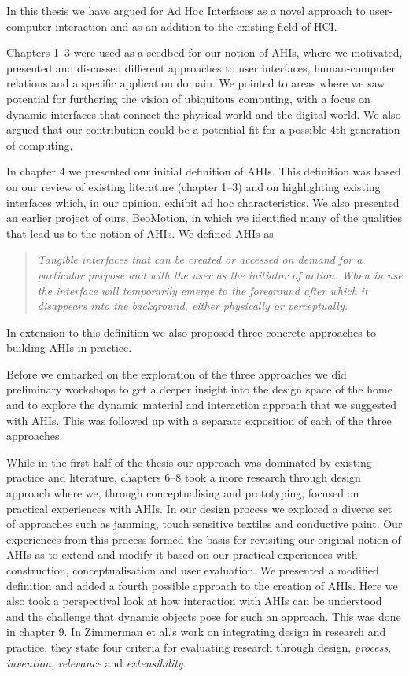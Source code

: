 
In this thesis we have argued for Ad Hoc Interfaces as a novel approach to user-computer interaction and as an addition to the existing field of HCI.

Chapters 1--3 were used as a seedbed for our notion of AHIs, where we motivated, presented and discussed different approaches to user interfaces, human-computer relations and a specific application domain.
We pointed to areas where we saw potential for furthering the vision of ubiquitous computing, with a focus on dynamic interfaces that connect the physical world and the digital world.
We also argued that our contribution could be a potential fit for a possible 4th generation of computing.  

In chapter 4 we presented our initial definition of AHIs.
This definition was based on our review of existing literature (chapter 1--3) and on highlighting existing interfaces which, in our opinion, exhibit ad hoc characteristics.
We also presented an earlier project of ours, BeoMotion, in which we identified many of the qualities that lead us to the notion of AHIs.
We defined AHIs as 

\begin{quotation}
\emph{Tangible interfaces that can be created or accessed on demand for a particular purpose and with the user as the initiator of action. When in use the interface will temporarily emerge to the foreground after which it disappears into the background, either physically or perceptually.}
\end{quotation}
In extension to this definition we also proposed three concrete approaches to building AHIs in practice.

Before we embarked on the exploration of the three approaches we did preliminary workshops to get a deeper insight into the design space of the home and to explore the dynamic material and interaction approach that we suggested with AHIs.
This was followed up with a separate exposition of each of the three approaches.

While in the first half of the thesis our approach was dominated by existing practice and literature, chapters 6--8 took a more research through design approach where we, through conceptualising and prototyping, focused on practical experiences with AHIs.
In our design process we explored a diverse set of approaches such as jamming, touch sensitive textiles and conductive paint.
Our experiences from this process formed the basis for revisiting our original notion of AHIs as to extend and modify it based on our practical experiences with construction, conceptualisation and user evaluation.
We presented a modified definition and added a fourth possible approach to the creation of AHIs.
Here we also took a perspectival look at how interaction with AHIs can be understood and the challenge that dynamic objects pose for such an approach.
This was done in chapter 9.
\blank
In Zimmerman et al.'s \citep{zimmerman2007research} work on integrating design in research and practice, they state four criteria for evaluating research through design, \emph{process}, \emph{invention}, \emph{relevance} and \emph{extensibility}.

